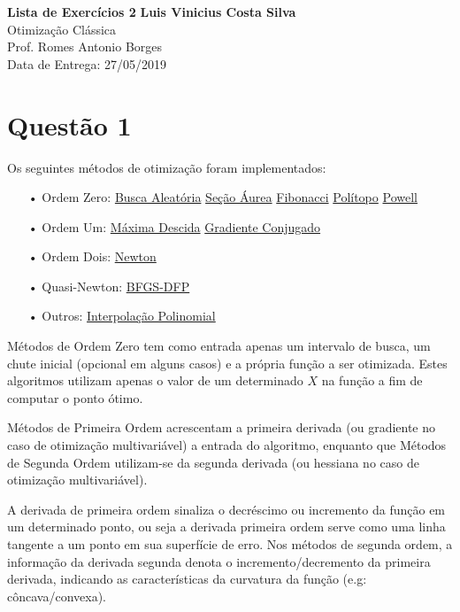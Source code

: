 \documentclass[fleqn, 11pt]{article}
\begin{document}
\noindent
\large\textbf{Lista de Exercícios 2} \hfill \textbf{Luis Vinicius Costa Silva} \\
\normalsize Otimização Clássica \\
Prof. Romes Antonio Borges \\
\hfill Data de Entrega: 27/05/2019

\section*{Questão 1}
Os seguintes métodos de otimização foram implementados:

\begin{itemize}
\item[•] Ordem Zero:
   \subitem \hyperref[buscaAleatoria]{Busca Aleatória}
   \subitem \hyperref[secaoAurea]{Seção Áurea}
   \subitem \hyperref[fibonacci]{Fibonacci}
   \subitem \hyperref[nelderMead]{Polítopo}
   \subitem \hyperref[powell]{Powell}
      
\item[•] Ordem Um:
   \subitem \hyperref[maximaDescida]{Máxima Descida}
   \subitem \hyperref[gradienteConjugado]{Gradiente Conjugado}
   
\item[•] Ordem Dois:
   \subitem \hyperref[newton]{Newton}
   
\item[•] Quasi-Newton:   
   \subitem \hyperref[bfgs]{BFGS-DFP}

\item[•] Outros:
   \subitem \hyperref[interpol]{Interpolação Polinomial}   
\end{itemize}

Métodos de Ordem Zero tem como entrada apenas um intervalo de busca, um chute inicial (opcional em alguns casos) e a própria função a ser otimizada. Estes algoritmos utilizam apenas o valor de um determinado $X$ na função a fim de computar o ponto ótimo.\newline

Métodos de Primeira Ordem acrescentam a primeira derivada (ou gradiente no caso de otimização multivariável) a entrada do algoritmo, enquanto que Métodos de Segunda Ordem utilizam-se da segunda derivada (ou hessiana no caso de otimização multivariável). \newline

A derivada de primeira ordem sinaliza o decréscimo ou incremento da função em um determinado ponto, ou seja a derivada primeira ordem serve como uma linha tangente a um ponto em sua superfície de erro. Nos métodos de segunda ordem, a informação da derivada segunda denota o incremento/decremento da primeira derivada, indicando as características da curvatura da função (e.g: côncava/convexa).\newline
\end{document}
